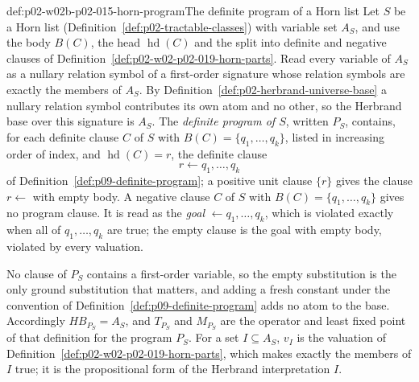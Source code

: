\begin{hbdefinition}{def:p02-w02b-p02-015-horn-program}{The definite program of a Horn list}
Let \(S\) be a Horn list (Definition~\ref{def:p02-tractable-classes}) with
variable set \(A_S\), and use the body \(B(C)\), the head
\(\operatorname{hd}(C)\) and the split into definite and negative clauses of
Definition~\ref{def:p02-w02-p02-019-horn-parts}.  Read every variable of
\(A_S\) as a nullary relation symbol of a first-order signature whose relation
symbols are exactly the members of \(A_S\).  By
Definition~\ref{def:p02-herbrand-universe-base} a nullary relation symbol
contributes its own atom and no other, so the Herbrand base over this
signature is \(A_S\).  The \emph{definite program of \(S\)}, written
\(P_S\), contains, for each definite clause \(C\) of \(S\) with
\(B(C)=\{q_1,\ldots,q_k\}\), listed in increasing order of index, and
\(\operatorname{hd}(C)=r\), the definite clause
\[
 r\leftarrow q_1,\ldots,q_k
\]
of Definition~\ref{def:p09-definite-program}; a positive unit clause
\(\{r\}\) gives the clause \(r\leftarrow{}\) with empty body.  A negative
clause \(C\) of \(S\) with \(B(C)=\{q_1,\ldots,q_k\}\) gives no program
clause.  It is read as the \emph{goal} \(\leftarrow q_1,\ldots,q_k\), which is
violated exactly when all of \(q_1,\ldots,q_k\) are true; the empty clause is
the goal with empty body, violated by every valuation.

No clause of \(P_S\) contains a first-order variable, so the empty
substitution is the only ground substitution that matters, and adding a fresh
constant under the convention of Definition~\ref{def:p09-definite-program}
adds no atom to the base.  Accordingly \(\mathit{HB}_{P_S}=A_S\), and
\(T_{P_S}\) and \(M_{P_S}\) are the operator and least fixed point of that
definition for the program \(P_S\).  For a set \(I\subseteq A_S\), \(v_I\) is
the valuation of Definition~\ref{def:p02-w02-p02-019-horn-parts}, which makes
exactly the members of \(I\) true; it is the propositional form of the
Herbrand interpretation \(I\).
\end{hbdefinition}

